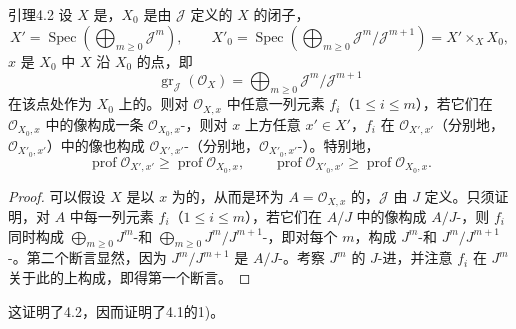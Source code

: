 \begin{SGAresult}{引理}{4.2}
设 $X$ 是，$X_0$ 是由 $\mathcal J$ 定义的 $X$ 的闭子，
\[
 X'=\operatorname{Spec}\left(\bigoplus_{m\geq0}\mathcal J^m\right),\qquad
 X'_0=\operatorname{Spec}\left(\bigoplus_{m\geq0}\mathcal J^m/\mathcal J^{m+1}\right)=X'\times_XX_0,
\]
$x$ 是 $X_0$ 中 $X$ 沿 $X_0$ 的点，即
\[
 \operatorname{gr}_{\mathcal J}(\mathcal O_X)=\bigoplus_{m\geq0}\mathcal J^m/\mathcal J^{m+1}
\]
在该点处作为 $X_0$ 上的。则对 $\mathcal O_{X,x}$ 中任意一列元素 $f_i$（$1\leq i\leq m$），若它们在 $\mathcal O_{X_0,x}$ 中的像构成一条 $\mathcal O_{X_0,x}$-，则对 $x$ 上方任意 $x'\in X'$，$f_i$ 在 $\mathcal O_{X',x'}$（分别地，$\mathcal O_{X'_0,x'}$）中的像也构成 $\mathcal O_{X',x'}$-（分别地，$\mathcal O_{X'_0,x'}$-）。特别地，
\[
 \operatorname{prof}\mathcal O_{X',x'}\geq\operatorname{prof}\mathcal O_{X_0,x},\qquad
 \operatorname{prof}\mathcal O_{X'_0,x'}\geq\operatorname{prof}\mathcal O_{X_0,x}.\tag{23}
\]
\end{SGAresult}
\begin{proof}
可以假设 $X$ 是以 $x$ 为的，从而是环为 $A=\mathcal O_{X,x}$ 的，$\mathcal J$ 由 $J$ 定义。只须证明，对 $A$ 中每一列元素 $f_i$（$1\leq i\leq m$），若它们在 $A/J$ 中的像构成 $A/J$-，则 $f_i$ 同时构成 $\bigoplus_{m\geq0}J^m$-和 $\bigoplus_{m\geq0}J^m/J^{m+1}$-，即对每个 $m$，构成 $J^m$-和 $J^m/J^{m+1}$-。第二个断言显然，因为 $J^m/J^{m+1}$ 是 $A/J$-。考察 $J^m$ 的 $J$-进，并注意 $f_i$ 在 $J^m$ 关于此的上构成，即得第一个断言。
\end{proof}
这证明了4.2，因而证明了4.1的1)。
